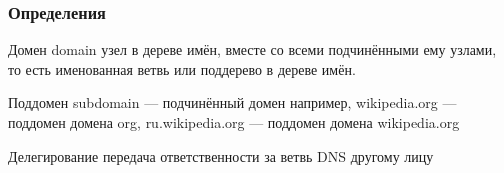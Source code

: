 \begin{frame}
    \frametitle{Определения}
    \begin{block}{Домен domain}
    узел в дереве имён, вместе со всеми подчинёнными ему узлами, то есть именованная ветвь или поддерево в дереве имён.
    \end{block}
    \begin{block}{Поддомен subdomain}
         — подчинённый домен например, wikipedia.org — поддомен домена org, 
         ru.wikipedia.org — поддомен домена wikipedia.org
    \end{block}
    \begin{block}{Делегирование}
     передача ответственности за ветвь DNS другому лицу
    \end{block}
\end{frame}

